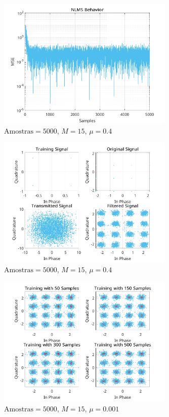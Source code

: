 \documentclass[a4paper,10pt]{article}
\begin{document}
\begin{enumerate}
				\begin{figure}[H]
					\centering
					\includegraphics[width=0.75\textwidth]{figs/L3Q6_A_mse.png}
					\caption{$\text{Amostras} = 5000$, $M = 15$, $\mu = 0.4$}
					\label{fig:L3Q6A1}
				\end{figure}

				\begin{figure}[H]
					\centering
					\includegraphics[width=0.75\textwidth]{figs/L3Q6_A_t.png}
					\caption{$\text{Amostras} = 5000$, $M = 15$, $\mu = 0.4$}
					\label{fig:L3Q6A2}
				\end{figure}

				\begin{figure}[H]
					\centering
					\includegraphics[width=0.75\textwidth]{figs/L3Q6_B_t.png}
					\caption{$\text{Amostras} = 5000$, $M = 15$, $\mu = 0.001$}
					\label{fig:L3Q6B}
				\end{figure}


\end{enumerate}
\end{document}
